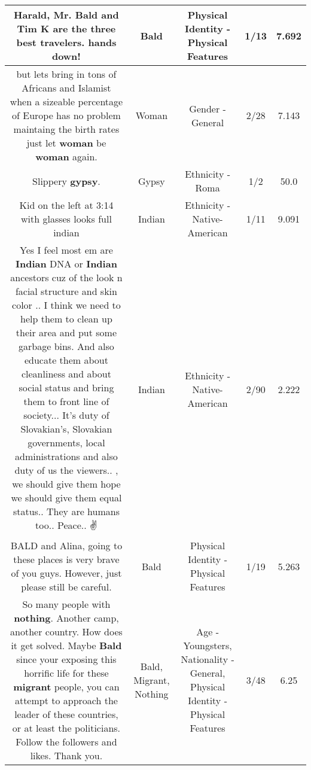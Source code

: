 \documentclass[11pt]{article}
\newlength\mylength
\begin{document}
\begin{center}
\begin{longtable}{|C{.65\mylength}|C{.30\mylength}|C{.12\mylength}|C{.12\mylength}|C{.12\mylength}|}
  \small Harald, Mr. \textbf{Bald} and Tim K are the three best travelers. hands down!\normalsize   & Bald & Physical Identity - Physical Features & 1/13 & 7.692 \\  \hline
  \small but lets bring in tons of Africans and Islamist when a sizeable percentage of Europe has no problem maintaing the birth rates just let \textbf{woman} be \textbf{woman} again.\normalsize   & Woman & Gender - General & 2/28 & 7.143 \\  \hline
  \small Slippery \textbf{gypsy}.\normalsize   & Gypsy & Ethnicity - Roma & 1/2 & 50.0 \\  \hline
  \small Kid on the left at 3:14 with glasses looks full indian\normalsize   & Indian & Ethnicity - Native-American & 1/11 & 9.091 \\  \hline
  \small Yes I feel most em are \textbf{Indian} DNA or \textbf{Indian} ancestors cuz of the look n facial structure and skin color ..  I think we need to help them to clean up their area and put some garbage bins.   And also educate them about cleanliness and about social status and bring them to front line of society...  It's duty of Slovakian's, Slovakian governments, local administrations and also duty of us the viewers..  , we should give them hope we should give them equal status..  They are humans too..   Peace..  ✌\normalsize   & Indian & Ethnicity - Native-American & 2/90 & 2.222 \\  \hline
  \small BALD and Alina, going to these places is very brave of you guys. However, just please still be careful.\normalsize   & Bald & Physical Identity - Physical Features & 1/19 & 5.263 \\  \hline
  \small So many people with \textbf{nothing}. Another camp, another country. How does it get solved. Maybe \textbf{Bald} since your exposing this horrific life for these \textbf{migrant} people, you can attempt to approach the leader of these countries, or at least the politicians. Follow the followers and likes. Thank you.\normalsize   & Bald, Migrant, Nothing & Age - Youngsters, Nationality - General, Physical Identity - Physical Features & 3/48 & 6.25 \\  \hline

\end{longtable}
\end{center}
\end{document}
